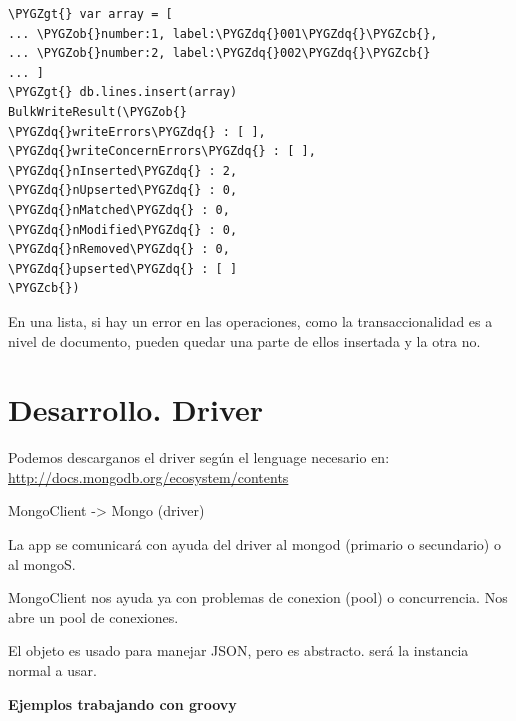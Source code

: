 \documentclass[a4paper,10pt,english]{sphinxmanual}
\def\PYGZob{\char`\{}
\def\PYGZcb{\char`\}}
\def\PYGZgt{\char`\>}
\def\PYGZdq{\char`\"}
\begin{document}
\begin{Verbatim}[commandchars=\\\{\}]
\PYGZgt{} var array = [
... \PYGZob{}number:1, label:\PYGZdq{}001\PYGZdq{}\PYGZcb{},
... \PYGZob{}number:2, label:\PYGZdq{}002\PYGZdq{}\PYGZcb{}
... ]
\PYGZgt{} db.lines.insert(array)
BulkWriteResult(\PYGZob{}
\PYGZdq{}writeErrors\PYGZdq{} : [ ],
\PYGZdq{}writeConcernErrors\PYGZdq{} : [ ],
\PYGZdq{}nInserted\PYGZdq{} : 2,
\PYGZdq{}nUpserted\PYGZdq{} : 0,
\PYGZdq{}nMatched\PYGZdq{} : 0,
\PYGZdq{}nModified\PYGZdq{} : 0,
\PYGZdq{}nRemoved\PYGZdq{} : 0,
\PYGZdq{}upserted\PYGZdq{} : [ ]
\PYGZcb{})
\end{Verbatim}

En una lista, si hay un error en las operaciones, como la transaccionalidad es a nivel de documento, pueden quedar una parte de ellos insertada y la otra no.


\chapter{Desarrollo. Driver}
\label{contents/driver::doc}\label{contents/driver:desarrollo-driver}
Podemos descarganos el driver según el lenguage necesario en: \href{http://docs.mongodb.org/ecosystem/contents}{http://docs.mongodb.org/ecosystem/contents}

MongoClient -\textgreater{} Mongo (driver)

La app se comunicará con ayuda del driver al mongod (primario o secundario) o al mongoS.

MongoClient nos ayuda ya con problemas de conexion (pool) o concurrencia. Nos abre un pool de conexiones.

El objeto  es usado para manejar JSON, pero es abstracto.  será la instancia normal a usar.

\textbf{Ejemplos trabajando con groovy}
\end{document}
